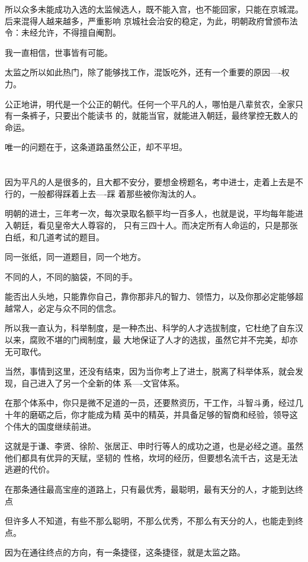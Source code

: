 \documentclass[11pt,a4paper,onecolumn]{article}
\begin{document}
所以众多未能成功入选的太监候选人，既不能入宫，也不能回家，只能在京城混。后来混得人越来越多，严重影响
京城社会治安的稳定，为此，明朝政府曾颁布法令：未经允许，不得擅自阉割。

我一直相信，世事皆有可能。

太监之所以如此热门，除了能够找工作，混饭吃外，还有一个重要的原因----权力。

公正地讲，明代是一个公正的朝代。任何一个平凡的人，哪怕是八辈贫农，全家只有一条裤子，只要出个能读书
的，就能当官，就能进入朝廷，最终掌控无数人的命运。

唯一的问题在于，这条道路虽然公正，却不平坦。

\section[\thesection]{}

因为平凡的人是很多的，且大都不安分，要想金榜题名，考中进士，走着上去是不行的，一般都得踩着上去----踩
着那些被你淘汰的人。

明朝的进士，三年考一次，每次录取名额平均一百多人，也就是说，平均每年能进入朝廷，看见皇帝大人尊容的，
只有三四十人。而决定所有人命运的，只是那张白纸，和几道考试的题目。

同一张纸，同一道题目，同一个地方。

不同的人，不同的脑袋，不同的手。

能否出人头地，只能靠你自己，靠你那非凡的智力、领悟力，以及你那必定能够超越常人，必定与众不同的信念。

所以我一直认为，科举制度，是一种杰出、科学的人才选拔制度，它杜绝了自东汉以来，腐败不堪的门阀制度，最
大地保证了人才的选拔，虽然它并不完美，却亦无可取代。

当然，事情到这里，还没有结束，因为当你考上了进士，脱离了科举体系，就会发现，自己进入了另一个全新的体
系----文官体系。

在那个体系中，你只是微不足道的一员，还要熬资历，干工作，斗智斗勇，经过几十年的磨砺之后，你才能成为精
英中的精英，并具备足够的智商和经验，领导这个伟大的国度继续前进。

这就是于谦、李贤、徐阶、张居正、申时行等人的成功之道，也是必经之道。虽然他们都具有优异的天赋，坚韧的
性格，坎坷的经历，但要想名流千古，这是无法逃避的代价。

在那条通往最高宝座的道路上，只有最优秀，最聪明，最有天分的人，才能到达终点

但许多人不知道，有些不那么聪明，不那么优秀，不那么有天分的人，也能走到终点。

因为在通往终点的方向，有一条捷径，这条捷径，就是太监之路。
\end{document}
